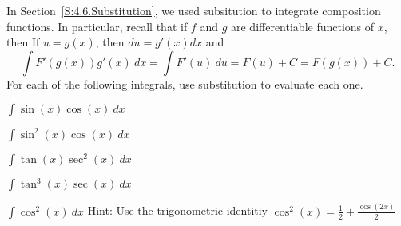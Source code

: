 \begin{pa} \label{PA:5.2}
In Section~\ref{S:4.6.Substitution}, we used subsitution to integrate composition functions.  In particular, recall that if $f$ and $g$ are differentiable functions of $x$, then
If $u = g(x)$, then $du = g'(x)dx$ and 
\[ \int F'(g(x))g'(x)\ dx = \int F'(u)\ du = F(u)+C = F(g(x))+C. \]
For each of the following integrals, use substitution to evaluate each one. 
	\be
		\item $\int \sin(x)\cos(x) \ dx$
		\item $\int \sin^2(x)\cos(x) \ dx$
		\item $\int \tan(x)\sec^2(x) \ dx$
		\item $\int \tan^3(x)\sec(x) \ dx$
		\item $\int \cos^2(x) \ dx$ Hint: Use the trigonometric identitiy $ \cos^2(x) = \frac{1}{2} + \frac{\cos(2x)}{2}$
	\ee
\end{pa} 
\afterpa